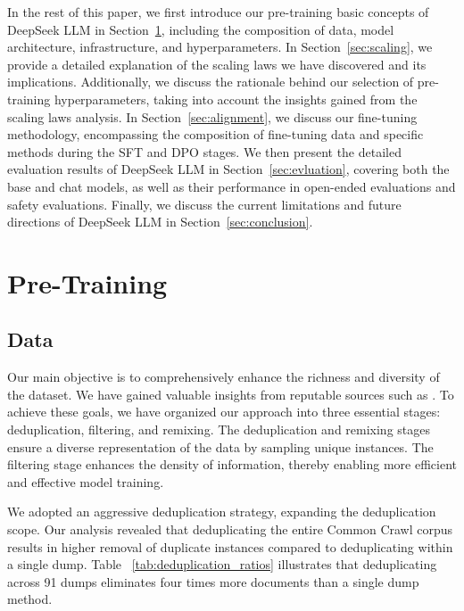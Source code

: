 In the rest of this paper, we first introduce our pre-training basic concepts of DeepSeek LLM in Section~\ref{sec:pre-training}, including the composition of data, model architecture, infrastructure, and hyperparameters. In Section~\ref{sec:scaling}, we provide a detailed explanation of the scaling laws we have discovered and its implications. Additionally, we discuss the rationale behind our selection of pre-training hyperparameters, taking into account the insights gained from the scaling laws analysis. In Section~\ref{sec:alignment}, we discuss our fine-tuning methodology, encompassing the composition of fine-tuning data and specific methods during the SFT and DPO stages. We then present the detailed evaluation results of DeepSeek LLM in Section~\ref{sec:evluation}, covering both the base and chat models, as well as their performance in open-ended evaluations and safety evaluations. Finally, we discuss the current limitations and future directions of DeepSeek LLM in Section~\ref{sec:conclusion}.

\section{Pre-Training}

\label{sec:pre-training}

\subsection{Data}

Our main objective is to comprehensively enhance the richness and diversity of the dataset. We have gained valuable insights from reputable sources such as \citep{pile, llama, redpajama, refinedweb}. To achieve these goals, we have organized our approach into three essential stages: deduplication, filtering, and remixing. The deduplication and remixing stages ensure a diverse representation of the data by sampling unique instances. The filtering stage enhances the density of information, thereby enabling more efficient and effective model training.

We adopted an aggressive deduplication strategy, expanding the deduplication scope. Our analysis revealed that deduplicating the entire Common Crawl corpus results in higher removal of duplicate instances compared to deduplicating within a single dump. Table ~\ref{tab:deduplication_ratios} illustrates that deduplicating across 91 dumps eliminates four times more documents than a single dump method.

